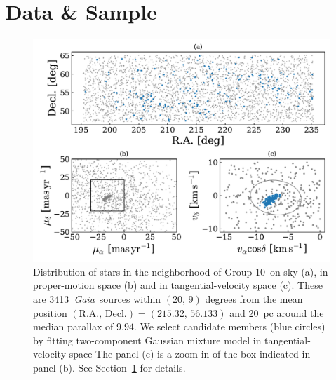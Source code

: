 \documentclass[modern,letterpaper]{aastex61}
\newcommand{\project}[1]{\textsl{#1}}
\newcommand{\gaia}{\project{Gaia}}
\newcommand{\sectionname}{Section}
\newcommand{\groupTen}{Group 10}
\newcommand{\nstarsInRegion}{3413}
\begin{document}
\section{Data \& Sample}
\label{sec:data}



\begin{figure}
  \includegraphics[width=0.95\linewidth]{g10_sky_pm.pdf}
  \caption{Distribution of stars in the neighborhood of \groupTen\
    on sky (a), in proper-motion space (b) and in tangential-velocity space (c).
    These are \nstarsInRegion\ \gaia\ sources within
    $(20,\,9)$ degrees from the mean position
    $(\mathrm{R.A.},\,\mathrm{Decl.}) = (215.32,\,56.133)$ and
    20~pc around the median parallax of $9.94$.
    We select candidate members (blue circles) by fitting two-component Gaussian
    mixture model in tangential-velocity space
    The panel (c) is a zoom-in of the box indicated in panel (b).
    See \sectionname~\ref{sec:data} for details.
    }
  \label{fig:distributions}
\end{figure}
\end{document}
